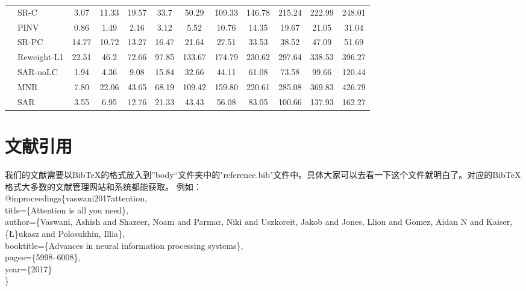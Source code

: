 \begin{table}[htbp]
{\begin{tabular}{llcccccccccc}
  & SR-C & 3.07 & 11.33 & 19.57 & 33.7 & 50.29 & 109.33 & 146.78 & 215.24 & 222.99 & 248.01\\
  & PINV & 0.86 & 1.49 & 2.16 & 3.12 & 5.52 & 10.76 & 14.35 & 19.67 & 21.05 & 31.04\\
  & SR-PC & 14.77 & 10.72 & 13.27 & 16.47 & 21.64 & 27.51 & 33.53 & 38.52 & 47.09 & 51.69 \\
  & Reweight-L1 & 22.51 & 46.2 & 72.66 & 97.85 & 133.67 & 174.79 & 230.62 & 297.64 & 338.53 & 396.27 \\
  & SAR-noLC & 1.94 & 4.36 & 9.08 & 15.84 & 32.66 & 44.11 & 61.08 & 73.58 & 99.66 & 120.44 \\
  & \cellcolor[rgb]{.7,.8,.9}MNR & \cellcolor[rgb]{.7,.8,.9}7.80 & \cellcolor[rgb]{.7,.8,.9}22.06 & \cellcolor[rgb]{.7,.8,.9}43.65 & \cellcolor[rgb]{.7,.8,.9}68.19 & \cellcolor[rgb]{.7,.8,.9}109.42 & \cellcolor[rgb]{.7,.8,.9}159.80 & \cellcolor[rgb]{.7,.8,.9}220.61 & \cellcolor[rgb]{.7,.8,.9}285.08 & \cellcolor[rgb]{.7,.8,.9}369.83 & \cellcolor[rgb]{.7,.8,.9}426.79 \\
  & \cellcolor[rgb]{1,.9,.6}SAR & \cellcolor[rgb]{1,.9,.6}3.55 & \cellcolor[rgb]{1,.9,.6}6.95 & \cellcolor[rgb]{1,.9,.6}12.76 & \cellcolor[rgb]{1,.9,.6}21.33 & \cellcolor[rgb]{1,.9,.6}43.43 & \cellcolor[rgb]{1,.9,.6}56.08 & \cellcolor[rgb]{1,.9,.6}83.05 & \cellcolor[rgb]{1,.9,.6}100.66 & \cellcolor[rgb]{1,.9,.6}137.93 & \cellcolor[rgb]{1,.9,.6}162.27 \\
  \bottomrule
  \end{tabular}}
\end{table}


\section{文献引用}
我们的文献需要以BibTeX的格式放入到”body“文件夹中的"reference.bib"文件中。具体大家可以去看一下这个文件就明白了。对应的BibTeX格式大多数的文献管理网站和系统都能获取。
例如：\\
@inproceedings\{vaswani2017attention,\\
  title=\{Attention is all you need\},\\
  author=\{Vaswani, Ashish and Shazeer, Noam and Parmar, Niki and Uszkoreit, Jakob and Jones, Llion and Gomez, Aidan N and Kaiser, \{\L\}ukasz and Polosukhin, Illia\},\\
  booktitle=\{Advances in neural information processing systems\},\\
  pages=\{5998--6008\},\\
  year=\{2017\}\\
\}

